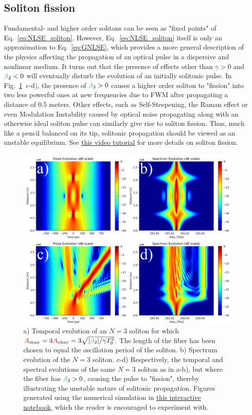 \subsection{Soliton fission}
\label{subsec:fission}
Fundamental- and higher order solitons can be seen as "fixed points" of Eq.~\ref{eq:NLSE_soliton}. However, Eq.~\ref{eq:NLSE_soliton} itself is only an approximation to Eq.~\ref{eq:GNLSE}, which provides a more general description of the physics affecting the propagation of an optical pulse in a dispersive and nonlinear medium. It turns out that the presence of effects other than $\gamma>0$ and $\betag_2<0$ will eventually disturb the evolution of an initially solitonic pulse. In Fig.~\ref{fig:Soliton_comparison}~c-d), the presence of $\betag_3>0$ causes a higher order soliton to "fission" into two less powerful ones at new frequencies due to FWM after propagating a distance of 0.5 meters. Other effects, such as Self-Steepening, the Raman effect or even Modulation Instability caused by optical noise propagating along with an otherwise ideal soliton pulse can similarly give rise to soliton fission. Thus, much like a pencil balanced on its tip, solitonic propagation should be viewed as an unstable equilibrium. See \href{https://youtu.be/tHpIR2Kuxp0}{this video tutorial} for more details on soliton fission.
\begin{figure}
    \centering
    \includegraphics[width=1\linewidth]{figures/Soliton_comparison.png}
    \caption{a) Temporal evolution of an $N=3$ soliton for which $\A_{max}=3\A_{char}=3\sqrt{|\betag_2|/\gamma T_0^2}$. The length of the fiber has been chosen to equal the oscillation period of the soliton. b) Spectrum evolution of the $N=3$ soliton. c-d) Respectively, the temporal and spectral evolutions of the same $N=3$ soliton as in a-b), but where the fiber has $\betag_3>0$, causing the pulse to "fission", thereby illustrating the unstable nature of solitonic propagation. Figures generated using the numerical simulation in \href{https://colab.research.google.com/drive/123pT-IsLWIEZY9XW3-1WzkTXfg1IEkkD?usp=sharing}{this interactive notebook}, which the reader is encouraged to experiment with.}
    \label{fig:Soliton_comparison}
\end{figure}

